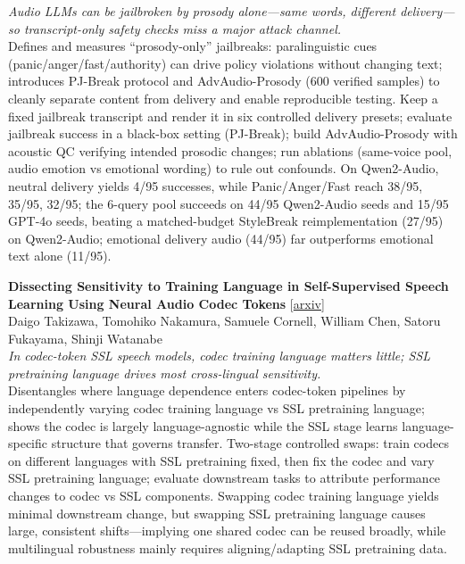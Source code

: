 \documentclass[12pt,letterpaper]{article}
\begin{document}
{\small\textit{Audio LLMs can be jailbroken by prosody alone---same words, different delivery---so transcript-only safety checks miss a major attack channel.}}\\[1pt]
{\footnotesize Defines and measures ``prosody-only'' jailbreaks: paralinguistic cues (panic/anger/fast/authority) can drive policy violations without changing text; introduces PJ-Break protocol and AdvAudio-Prosody (600 verified samples) to cleanly separate content from delivery and enable reproducible testing. Keep a fixed jailbreak transcript and render it in six controlled delivery presets; evaluate jailbreak success in a black-box setting (PJ-Break); build AdvAudio-Prosody with acoustic QC verifying intended prosodic changes; run ablations (same-voice pool, audio emotion vs emotional wording) to rule out confounds. On Qwen2-Audio, neutral delivery yields 4/95 successes, while Panic/Anger/Fast reach 38/95, 35/95, 32/95; the 6-query pool succeeds on 44/95 Qwen2-Audio seeds and 15/95 GPT-4o seeds, beating a matched-budget StyleBreak reimplementation (27/95) on Qwen2-Audio; emotional delivery audio (44/95) far outperforms emotional text alone (11/95).}

\medskip

{\small\textbf{Dissecting Sensitivity to Training Language in Self-Supervised Speech Learning Using Neural Audio Codec Tokens}} {\scriptsize[\href{https://arxiv.org/abs/2607.26350}{arxiv}]}\\
{\scriptsize Daigo Takizawa, Tomohiko Nakamura, Samuele Cornell, William Chen, Satoru Fukayama, Shinji Watanabe}\\

{\small\textit{In codec-token SSL speech models, codec training language matters little; SSL pretraining language drives most cross-lingual sensitivity.}}\\[1pt]
{\footnotesize Disentangles where language dependence enters codec-token pipelines by independently varying codec training language vs SSL pretraining language; shows the codec is largely language-agnostic while the SSL stage learns language-specific structure that governs transfer. Two-stage controlled swaps: train codecs on different languages with SSL pretraining fixed, then fix the codec and vary SSL pretraining language; evaluate downstream tasks to attribute performance changes to codec vs SSL components. Swapping codec training language yields minimal downstream change, but swapping SSL pretraining language causes large, consistent shifts---implying one shared codec can be reused broadly, while multilingual robustness mainly requires aligning/adapting SSL pretraining data.}
\end{document}
